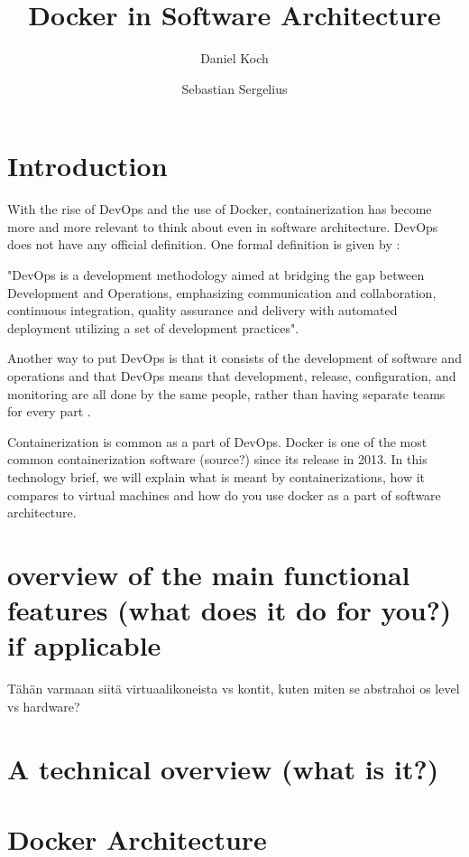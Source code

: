 \documentclass[fleqn,12pt]{olplainarticle}
\title{Docker in Software Architecture}
\author[1]{Daniel Koch}
\author[2]{Sebastian Sergelius}
\affil[1]{daniel.koch@helsinki.fi}
\affil[2]{github.com/sebazai}
\begin{document}
\flushbottom
\maketitle
\thispagestyle{empty}

\section*{Introduction}

With the rise of DevOps and the use of Docker, containerization has become more and more relevant to think about even
in software architecture. DevOps does not have any official definition.
One formal definition is given by \cite{Jabbari_devops}: 
\begin{displayquote}
"DevOps is a development methodology aimed at bridging the gap between Development and Operations, emphasizing communication and collaboration, continuous integration, quality assurance and delivery with automated deployment utilizing a set of development practices".
\end{displayquote}
Another way to put DevOps is that it consists of the development of software and operations and that DevOps means that development, release, configuration, and monitoring are all done by the same people, rather than having separate teams for every part \citep{hy:DevOps_with_Docker}.

Containerization is common as a part of DevOps. Docker is one of the most common containerization software (source?) since its release in 2013. In this technology brief, we will explain what is meant by containerizations, how it compares to virtual machines and how do you use docker as a part of software architecture.


\section*{overview of the main functional features (what does it do for you?) if applicable}

Tähän varmaan siitä virtuaalikoneista vs kontit, kuten miten se abstrahoi os level vs hardware?

\section*{A technical overview (what is it?)}

\section*{Docker Architecture}
\end{document}
